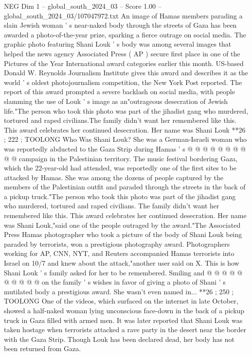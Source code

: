 \begin{textsample}{NEG Dim 1 – global\_south\_2024\_03 – Score 1.00 – global\_south\_2024\_03/107047972.txt}  \label{ex:f1_neg_110}
An image of Hamas members parading a slain Jewish woman ' s near-naked body through the streets of Gaza has been awarded a photo-of-the-year prize, sparking a fierce outrage on social media.
The graphic photo featuring Shani Louk ' s body was among several images that helped the news agency Associated Press ( AP ) secure first place in one of the Pictures of the Year International award categories earlier this month.
US-based Donald W.
Reynolds Journalism Institute gives this award and describes it as the world ' s oldest photojournalism competition, the New York Post reported.
The report of this award prompted a severe backlash on social media, with people slamming the use of Louk ' s image as an"outrageous desecration of Jewish life."The person who took this photo was part of the jihadist gang who murdered, tortured and raped civilians.The family didn't want her remembered like this.
This award celebrates her continued desecration.
Her name was Shani Louk **26 ; 222 ; TOOLONG Who Was Shani Louk?
She was a German-Israeli woman who was reportedly abducted to the Gaza Strip during Hamas ' s @ @ @ @ @ @ @ @ @ @ campaign in the Palestinian territory.
The music festival bordering Gaza, which the 22-year-old had attended, was reportedly one of the first sites to be attacked by Hamas.
She was among the dozens of people captured by the members of the Palestinian outfit and paraded through the streets in the back of a pickup truck."The person who took this photo was part of the jihadist gang who murdered, tortured and raped civilians.
The family didn't want her remembered like this.
This award celebrates her continued desecration.
Her name was Shani Louk,"said one of the people outraged by the award."The Associated Press Hamas photographer who took a picture of the body of Shani Louk being paraded by terrorists, won a prestigious photography award.
Photographers working for AP, CNN, NYT, and Reuters accompanied Hamas terrorists into Israel on 10/7 and knew about the attack,"another user said on X.
This is how Shani Louk ' s family asked for her to be remembered.
Smiling and @ @ @ @ @ @ @ @ @ @ on the family ' s wishes in favor of giving a photo of Shani ' s mutilated body a prestigious award.
She wasn't even named in... **26 ; 250 ; TOOLONG One of the videos, which surfaced on the internet in late October, showed a half-naked woman lying unconscious face-down in the back of a pickup truck in Gaza filled with armed men.
It was later reported that Shani Louk was taken hostage when terrorists attacked a rave party in the desert near the border with the Gaza Strip.
Though Louk has been declared dead, her body has not been returned from Gaza.

\end{textsample}
